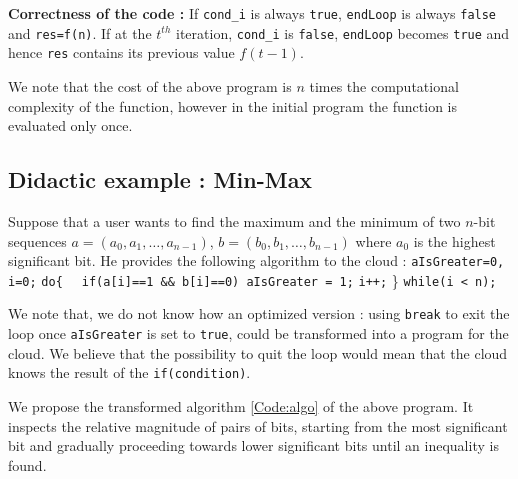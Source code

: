\documentclass{acm_proc_article-sp}
\begin{document}
\textbf{Correctness of the code :} If \texttt{cond\_i} is always \texttt{true}, \texttt{endLoop} is always \texttt{false} and \texttt{res=f(n)}. If at the $t^{th}$ iteration, \texttt{cond\_i} is \texttt{false}, \texttt{endLoop} becomes \texttt{true} and hence \texttt{res} contains its previous value $f(t-1)$. 

We note that the cost of the above program is $n$ times the computational complexity of the function, however in the initial program the function is evaluated only once.

\subsection{ Didactic example :  Min-Max}
\label{sec:ex}
Suppose that a user wants to find the maximum and the minimum of two $n$-bit sequences $a = (a_0,a_1,\ldots, a_{n-1})$, $b=(b_0,b_1,\ldots, b_{n-1})$ where $a_0$ is the highest significant bit. He provides the following algorithm to the cloud :
\newline \phantom{x} \texttt{aIsGreater=0, i=0;}
\newline \phantom{x} \texttt{do\{ }
\newline \phantom{x} \hspace{6ex} \texttt{ if(a[i]==1 \&\& b[i]==0) 
\newline \phantom{x} \hspace{14ex}aIsGreater = 1;}
\newline \phantom{x} \hspace{7ex} \texttt{i++;} 
\newline   \phantom{x} \} \texttt{while(i < n);} 

We note that, we do not know how an optimized version :  using \texttt{break} to exit the loop once \texttt{aIsGreater} is set to \texttt{true}, could be transformed into a program for the cloud. We believe that the possibility to quit the loop would mean that the cloud knows the result of the \texttt{if(condition)}. 

We propose the transformed algorithm \autoref{Code:algo} of the above program. It inspects the relative magnitude of pairs of bits, starting from the most significant bit and gradually proceeding towards lower significant bits until an inequality is found.
 


\linesnumbered
\end{document}
